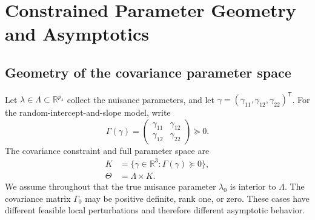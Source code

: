 \section{Constrained Parameter Geometry and Asymptotics}
\label{sec:geometry_asymptotics}

\subsection{Geometry of the covariance parameter space}
\label{subsec:covariance_geometry}
Let $\lambda\in\Lambda\subset\mathbb R^{p_\lambda}$ collect the nuisance parameters, and let $\gamma=(\gamma_{11},\gamma_{12},\gamma_{22})^{\mathsf T}$. For the random-intercept-and-slope model, write
\begin{equation}\label{eq:sec4-psd-cone}
\Gamma(\gamma)=
\begin{pmatrix}
\gamma_{11}&\gamma_{12}\\
\gamma_{12}&\gamma_{22}
\end{pmatrix}\succeq0.
\end{equation}
The covariance constraint and full parameter space are
\begin{equation}\label{eq:sec4-parameter-space}
\begin{aligned}
K&=\{\gamma\in\mathbb R^3:\Gamma(\gamma)\succeq0\},\\
\Theta&=\Lambda\times K.
\end{aligned}
\end{equation}
We assume throughout that the true nuisance parameter $\lambda_0$ is interior to $\Lambda$. The covariance matrix $\Gamma_0$ may be positive definite, rank one, or zero. These cases have different feasible local perturbations and therefore different asymptotic behavior.

